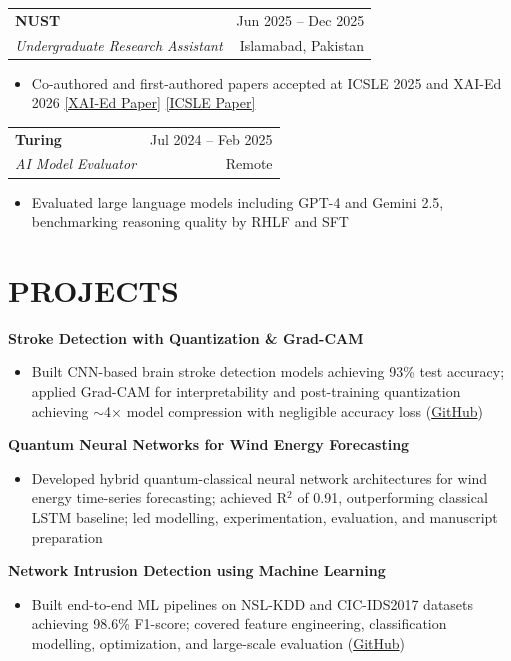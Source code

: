 \documentclass[letterpaper,9pt]{article}
\makeatletter
\newcommand{\resumeItem}[1]{
  \item \small{#1}
}
\newcommand{\resumeSubheading}[4]{
  \vspace{0pt}
  \begin{tabular*}{\textwidth}{l@{\extracolsep{\fill}}r}
    \textbf{\small #1} & {\color{dark-grey}\small #2} \\
    \textit{\small #3} & {\color{dark-grey}\small #4} \\
  \end{tabular*}
  \vspace{-5pt}
}
\newcommand{\resumeProjectHeading}[1]{
  \vspace{1pt}
  \textbf{\small #1}
  \vspace{-1pt}
}
\makeatother
\begin{document}
\resumeSubheading{NUST}{Jun 2025 -- Dec 2025}{Undergraduate Research Assistant}{Islamabad, Pakistan}
\begin{itemize}
\resumeItem{Co-authored and first-authored papers accepted at ICSLE 2025 and XAI-Ed 2026 \href{https://www.xai-ed.net/papers/XAI-Ed_2026_paper_1.pdf}{[XAI-Ed Paper]} \href{https://www.researchgate.net/publication/395837132_Barrier-Based_Inclusive_Design_in_VR_Addressing_DEI_Challenges_through_the_UDL_30_Framework}{[ICSLE Paper]}}
\end{itemize}

\resumeSubheading{Turing}{Jul 2024 -- Feb 2025}{AI Model Evaluator}{Remote}
\begin{itemize}
\resumeItem{Evaluated large language models including GPT-4 and Gemini 2.5, benchmarking reasoning quality by RHLF and SFT}
\end{itemize}

\section{PROJECTS}

\resumeProjectHeading{Stroke Detection with Quantization \& Grad-CAM}
\begin{itemize}
\resumeItem{Built CNN-based brain stroke detection models achieving 93\% test accuracy; applied Grad-CAM for interpretability and post-training quantization achieving $\sim$4$\times$ model compression with negligible accuracy loss (\href{https://github.com/92meharali}{GitHub})}
\end{itemize}

\resumeProjectHeading{Quantum Neural Networks for Wind Energy Forecasting}
\begin{itemize}
\resumeItem{Developed hybrid quantum-classical neural network architectures for wind energy time-series forecasting; achieved R$^2$ of 0.91, outperforming classical LSTM baseline; led modelling, experimentation, evaluation, and manuscript preparation}
\end{itemize}

\resumeProjectHeading{Network Intrusion Detection using Machine Learning}
\begin{itemize}
\resumeItem{Built end-to-end ML pipelines on NSL-KDD and CIC-IDS2017 datasets achieving 98.6\% F1-score; covered feature engineering, classification modelling, optimization, and large-scale evaluation (\href{https://github.com/92meharali}{GitHub})}
\end{itemize}
\end{document}
